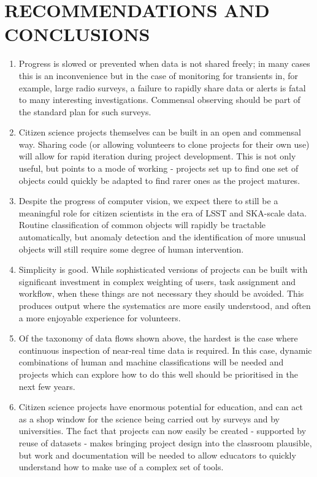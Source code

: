 \documentclass{pasa}
\begin{document}
\section{RECOMMENDATIONS AND CONCLUSIONS}
\label{sec:conclusions}

\begin{enumerate} 

\item Progress is slowed or prevented when data is not shared freely; in many cases this is an inconvenience but in the case of monitoring for transients in, for example, large radio surveys, a failure to rapidly share data or alerts is fatal to many interesting investigations. Commensal observing should be part of the standard plan for such surveys.

\item Citizen science projects themselves can be built in an open and commensal way. Sharing code (or allowing volunteers to clone projects for their own use) will allow for rapid iteration during project development. This is not only useful, but points to a mode of working - projects set up to find one set of objects could quickly be adapted to find rarer ones as the project matures. 

\item Despite the progress of computer vision, we expect there to still be a meaningful role for citizen scientists in the era of LSST and SKA-scale data. Routine classification of common objects will rapidly be tractable automatically, but anomaly detection and the identification of more unusual objects will still require some degree of human intervention. 

\item Simplicity is good. While sophisticated versions of projects can be built with significant investment in complex weighting of users, task assignment and workflow, when these things are not necessary they should be avoided. This produces output where the systematics are more easily understood, and often a more enjoyable experience for volunteers. 

\item Of the taxonomy of data flows shown above, the hardest is the case where continuous inspection of near-real time data is required. In this case, dynamic combinations of human and machine classifications will be needed and projects which can explore how to do this well should be prioritised in the next few years.

\item Citizen science projects have enormous potential for education, and can act as a shop window for the science being carried out by surveys and by universities. The fact that projects can now easily be created - supported by reuse of datasets - makes bringing project design into the classroom plausible, but work and documentation will be needed to allow educators to quickly understand how to make use of a complex set of tools. 

\end{enumerate} 
\end{document}
